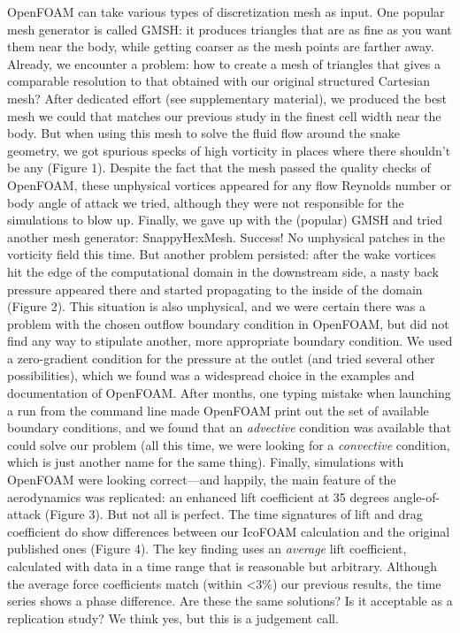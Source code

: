 \documentclass[9pt,twocolumn,twoside]{article}
\newlength{\up}
\begin{document}
OpenFOAM can take various types of discretization mesh as input. 
One popular mesh generator is called GMSH: it produces triangles that are as fine as you want them near the body, while getting coarser as the mesh points are farther away. 
Already, we encounter a problem: how to create a mesh of triangles that gives a comparable resolution to that obtained with our original structured Cartesian mesh? 
After dedicated effort (see supplementary material), we produced the best mesh we could that matches our previous study in the finest cell width near the body. 
But when using this mesh to solve the fluid flow around the snake geometry, we got spurious specks of high vorticity in places where there shouldn't be any (Figure 1). 
Despite the fact that the mesh passed the quality checks of OpenFOAM, these unphysical vortices appeared for any flow Reynolds number or body angle of attack we tried, although they were not responsible for the simulations to blow up.
Finally, we gave up with the (popular) GMSH and tried another mesh generator: SnappyHexMesh. 
Success! 
No unphysical patches in the vorticity field this time. 
But another problem persisted: after the wake vortices hit the edge of the computational domain in the downstream side, a nasty back pressure appeared there and started propagating to the inside of the domain (Figure 2). 
This situation is also unphysical, and we were certain there was a problem with the chosen outflow boundary condition in OpenFOAM, but did not find any way to stipulate another, more appropriate boundary condition. 
We used a zero-gradient condition for the pressure at the outlet (and tried several other possibilities), which we found was a widespread choice in the examples and documentation of OpenFOAM. 
After months, one typing mistake when launching a run from the command line made OpenFOAM print out the set of available boundary conditions, and we found that an \textit{advective} condition was available that could solve our problem (all this time, we were looking for a \textit{convective} condition, which is just another name for the same thing). 
Finally, simulations with OpenFOAM were looking correct---and happily, the main feature of the aerodynamics was replicated: an enhanced lift coefficient at 35 degrees angle-of-attack (Figure 3). 
But not all is perfect. 
The time signatures of lift and drag coefficient do show differences between our IcoFOAM calculation and the original published ones (Figure 4). 
The key finding uses an \textit{average} lift coefficient, calculated with data in a time range that is reasonable but arbitrary. 
Although the average force coefficients match (within <3\%) our previous results, the time series shows a phase difference. 
Are these the same solutions? 
Is it acceptable as a replication study? 
We think yes, but this is a judgement call.
\end{document}
